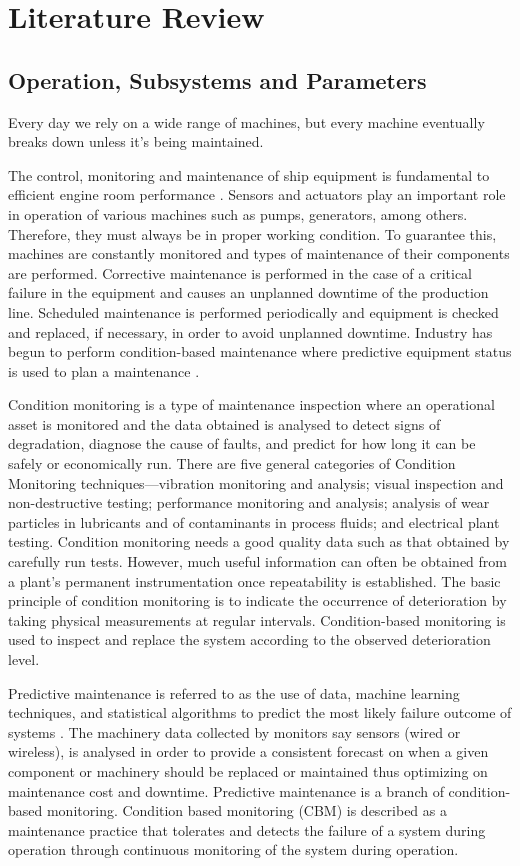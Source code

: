 \section{Literature Review}
\subsection{Operation, Subsystems and Parameters}
Every day we rely on a wide range of machines, but every machine eventually breaks down unless it’s being maintained.  

The control, monitoring and maintenance of ship equipment is fundamental to efficient engine room performance . Sensors and actuators play an important role in operation of various machines such as pumps, generators, among others. Therefore, they must always be in proper working condition. To guarantee this, machines are constantly monitored and types of maintenance of their components are performed. Corrective maintenance is performed in the case of a critical failure in the equipment and causes an unplanned downtime of the production line. Scheduled maintenance is performed periodically and equipment is checked and replaced, if necessary, in order to avoid unplanned downtime. Industry has begun to perform condition-based maintenance where predictive equipment status is used to plan a maintenance \cite{noauthor_predictive_nodate}.

Condition monitoring is a type of maintenance inspection where an operational asset is monitored and the data obtained is analysed to detect signs of degradation, diagnose the cause of faults, and predict for how long it can be safely or economically run. There are five general categories of Condition Monitoring techniques—vibration monitoring and analysis; visual inspection and non-destructive testing; performance monitoring and analysis; analysis of wear particles in lubricants and of contaminants in process fluids; and electrical plant testing. Condition monitoring needs a good quality data such as that obtained by carefully run tests. However, much useful information can often be obtained from a plant’s permanent instrumentation once repeatability is established\cite{lu_condition_2018}. The basic principle of condition monitoring is to indicate the occurrence of deterioration by taking physical measurements at regular intervals. Condition-based monitoring is used to inspect and replace the system according to the observed deterioration level. 

Predictive maintenance is referred to as the use of data, machine learning techniques, and statistical algorithms to predict the most likely failure outcome of systems \cite{tinga_predictive_2017}. The machinery data collected by monitors say sensors (wired or wireless), is analysed in order to provide a consistent forecast on when a given component or machinery should be replaced or maintained thus optimizing on maintenance cost and downtime. Predictive maintenance is a branch of condition-based monitoring. Condition based monitoring (CBM) is described as a maintenance practice that tolerates and detects the failure of a system during operation through continuous monitoring of the system during operation\cite{kimera_predictive_2020}. 

